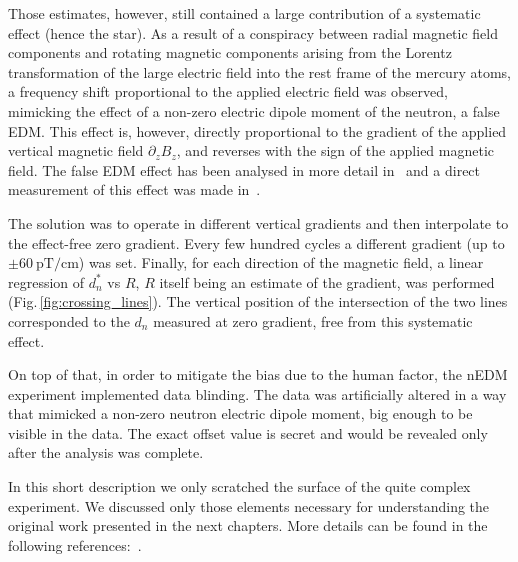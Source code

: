 Those estimates, however, still contained a large contribution of a systematic effect (hence the star). As a result of a conspiracy between radial magnetic field components and rotating magnetic components arising from the Lorentz transformation of the large electric field into the rest frame of the mercury atoms, a frequency shift proportional to the applied electric field was observed, mimicking the effect of a non-zero electric dipole moment of the neutron, a false EDM\@. This effect is, however, directly proportional to the gradient of the applied vertical magnetic field $\partial_z B_z$, and reverses with the sign of the applied magnetic field. The false EDM effect has been analysed in more detail in~\cite{Pendlebury2004,PhysRevA.71.032104,PhysRevA.73.014101} and a direct measurement of this effect was made in~\cite{Afach2015falseEDM}.

The solution was to operate in different vertical gradients and then interpolate to the effect-free zero gradient. Every few hundred cycles a different gradient (up to $\pm \SI{60}{\pico\tesla\per\centi\meter}$) was set.
Finally, for each direction of the magnetic field, a linear regression of $d_n^*$ vs $R$, $R$ itself being an estimate of the gradient, was performed (Fig.\,\ref{fig:crossing_lines}). The vertical position of the intersection of the two lines corresponded to the $d_n$ measured at zero gradient, free from this systematic effect.


On top of that, in order to mitigate the bias due to the human factor, the nEDM experiment implemented data blinding. The data was artificially altered in a way that mimicked a non-zero neutron electric dipole moment, big enough to be visible in the data. The exact offset value is secret and would be revealed only after the analysis was complete.

In this short description we only scratched the surface of the quite complex experiment. We discussed only those elements necessary for understanding the original work presented in the next chapters. More details can be found in the following references:~\cite{Zenner2013,Afach2015falseEDM,Afach2015,Afach2014magmoment,FertlThesis,Komposch2017}.

